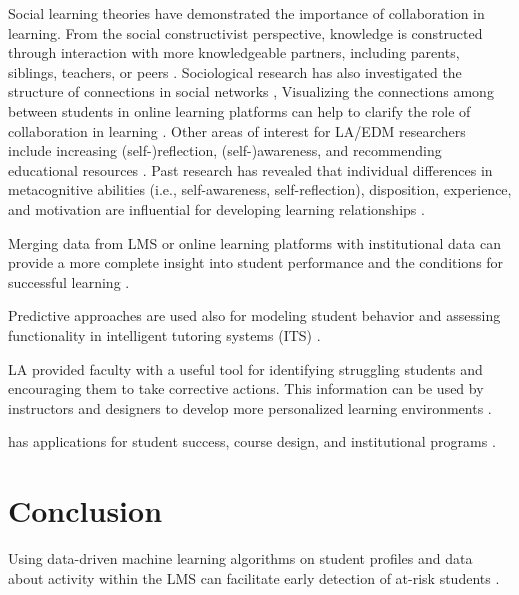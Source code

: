 \documentclass[sigconf]{acmart}
\begin{document}
Social learning theories have demonstrated 
the importance of collaboration in learning. From the social constructivist 
perspective, knowledge is constructed through interaction with more 
knowledgeable partners, including parents, siblings, teachers, or peers 
\cite{vygotsky78}. Sociological research has also investigated the structure 
of connections in social networks \cite{granovetter73}, Visualizing the 
connections among between students in online learning platforms can help
to clarify the role of collaboration in learning \cite{dawson14}. Other areas 
of interest for LA/EDM researchers include increasing (self-)reflection, 
(self-)awareness, and recommending educational resources 
\cite{lang17,lester19, papamitsiou14}. Past research has revealed that 
individual differences in metacognitive abilities (i.e., self-awareness, 
self-reflection), disposition, experience, and motivation are influential 
for developing learning relationships \cite{dawson14, gasevic15}.

Merging data from LMS or online learning platforms with institutional data 
can provide a more complete insight into student performance and the conditions 
for successful learning \cite{hora19}. 








Predictive approaches are used also for modeling student 
behavior and assessing functionality in intelligent tutoring systems (ITS)
\cite{penaayala14}. 


LA provided faculty with a useful tool for 
identifying struggling students and encouraging them to take corrective actions. 
This information can be used by instructors and designers to develop more 
personalized learning environments \cite{siemens13}. 

has applications 
for student success, course design, and institutional programs \cite{Lester19}. 


\section{Conclusion}

Using data-driven machine learning algorithms on student profiles and data 
about activity within the LMS can facilitate early detection of at-risk 
students \cite{Dekkar09}. 
\end{document}

